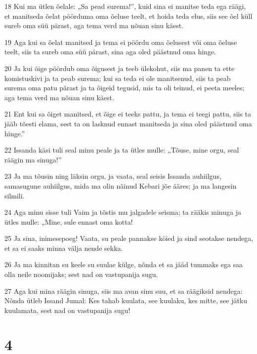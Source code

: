 \par 18 Kui ma ütlen õelale: „Sa pead surema!”, kuid sina ei manitse teda ega räägi, et manitseda õelat pöörduma oma õeluse teelt, et hoida teda elus, siis see õel küll sureb oma süü pärast, aga tema verd ma nõuan sinu käest.
\par 19 Aga kui sa õelat manitsed ja tema ei pöördu oma õelusest või oma õeluse teelt, siis ta sureb oma süü pärast, sina aga oled päästnud oma hinge.
\par 20 Ja kui õige pöördub oma õigusest ja teeb ülekohut, siis ma panen ta ette komistuskivi ja ta peab surema; kui sa teda ei ole manitsenud, siis ta peab surema oma patu pärast ja ta õigeid tegusid, mis ta oli teinud, ei peeta meeles; aga tema verd ma nõuan sinu käest.
\par 21 Ent kui sa õiget manitsed, et õige ei teeks pattu, ja tema ei teegi pattu, siis ta jääb tõesti elama, sest ta on lasknud ennast manitseda ja sina oled päästnud oma hinge.”
\par 22 Issanda käsi tuli seal minu peale ja ta ütles mulle: „Tõuse, mine orgu, seal räägin ma sinuga!”
\par 23 Ja ma tõusin ning läksin orgu, ja vaata, seal seisis Issanda auhiilgus, samasugune auhiilgus, mida ma olin näinud Kebari jõe ääres; ja ma langesin silmili.
\par 24 Aga minu sisse tuli Vaim ja tõstis mu jalgadele seisma; ta rääkis minuga ja ütles mulle: „Mine, sule ennast oma kotta!
\par 25 Ja sina, inimesepoeg! Vaata, su peale pannakse köied ja sind seotakse nendega, et sa ei saaks minna välja nende sekka.
\par 26 Ja ma kinnitan su keele su suulae külge, nõnda et sa jääd tummaks ega saa olla neile noomijaks; sest nad on vastupanija sugu.
\par 27 Aga kui mina räägin sinuga, siis ma avan sinu suu, et sa räägiksid nendega: Nõnda ütleb Issand Jumal: Kes tahab kuulata, see kuulaku, kes mitte, see jätku kuulamata, sest nad on vastupanija sugu!

\chapter{4}

